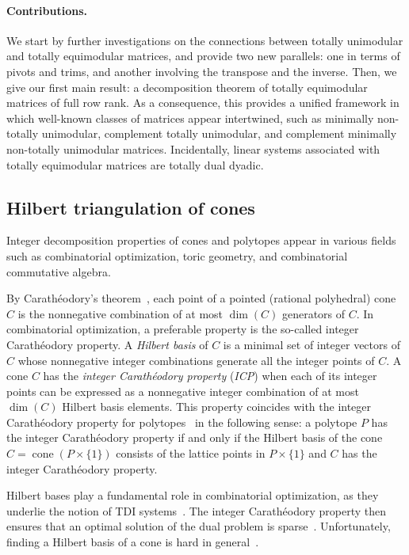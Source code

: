 \documentclass[11pt,a4paper]{amsart}
\theoremstyle{plain}
\theoremstyle{definition}
\DeclareMathOperator{\cone}{cone}
\begin{document}
\paragraph{\textbf{Contributions.}} We start by further investigations on the connections between totally unimodular and totally equimodular matrices, and provide two new parallels: one in terms of pivots and trims, and another involving the transpose and the inverse.
Then, we give our first main result: a decomposition theorem of totally equimodular matrices of full row rank.
As a consequence, this provides a unified framework in which well-known classes of matrices appear intertwined, such as minimally non-totally unimodular, complement totally unimodular, and complement minimally non-totally unimodular matrices.
Incidentally, linear systems associated with totally equimodular matrices are totally dual dyadic.



\subsection{Hilbert triangulation of cones}
%
Integer decomposition properties of cones and polytopes appear in various fields such as combinatorial optimization, toric geometry, and combinatorial commutative algebra.

By Carath\'eodory's theorem~\cite{Caratheodory1911}, each point of a pointed (rational polyhedral) cone $C$ is the nonnegative combination of at most $\dim (C)$ generators of $C$.
In combinatorial optimization, a preferable property is the so-called integer Carath\'eodory property.
A \emph{Hilbert basis} of $C$ is a minimal set of integer vectors of $C$ whose nonnegative integer combinations generate all the integer points of $C$.
A cone $C$ has the \emph{integer Carath\'eodory property} (\emph{ICP}) when each of its integer points can be expressed as a nonnegative integer combination of at most $\dim(C)$ Hilbert basis elements.
This property coincides with the integer Carath\'eodory property for polytopes~\cite{Gijswijt_Regts_2012} in the following sense: a polytope $P$ has the integer Carath\'eodory property if and only if the Hilbert basis of the cone $C=\cone(P\times\{1\})$ consists of the lattice points in $P\times\{1\}$ and $C$ has the integer Carath\'eodory property.

Hilbert bases play a fundamental role in combinatorial optimization, as they underlie the notion of TDI systems~\cite[{Theorem~22.5}]{Schrijver_1999}.
The integer Carath\'eodory property then ensures that an optimal solution of the dual problem is sparse~\cite{Cook_Fonlupt_Schrijver_1986}.
Unfortunately, finding a Hilbert basis of a cone is hard in general~\cite{Pap2011}.
\medskip
\end{document}
